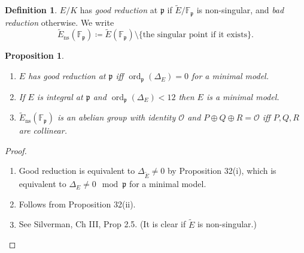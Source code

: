 \documentclass[a4paper]{article}
\newtheorem{proposition}[theorem]{Proposition}
\theoremstyle{definition}
\newtheorem*{definition}{Definition}
\DeclareMathOperator{\ord}{ord}
\newcommand{\ns}{\mathrm{ns}}
\newcommand{\p}{\mathfrak{p}}
\renewcommand{\O}{\mathcal{O}}
\newcommand{\F}{\mathbb{F}}
\begin{document}
\begin{definition}
    $E/K$ has \emph{good reduction} at $\p$ if $\tilde E/\F_\p$ is non-singular,
    and \emph{bad reduction} otherwise. We write
    \begin{equation*}
        \tilde E_\ns(\F_\p) \coloneq \tilde E(\F_\p)
            \setminus\{\text{the singular point if it exists}\}.
    \end{equation*}
\end{definition}

\begin{proposition}
    \begin{enumerate}[label=(\roman*)]
        \item $E$ has good reduction at $\p$ iff $\ord_\p(\Delta_E)=0$ for a
            minimal model.
        \item If $E$ is integral at $\p$ and $\ord_\p(\Delta_E)<12$ then $E$ is
            a minimal model.
        \item $\tilde E_\ns(\F_\p)$ is an abelian group with identity $\O$ and
            $P\oplus Q\oplus R=\O$ iff $P,Q,R$ are collinear.
    \end{enumerate}
\end{proposition}

\begin{proof}
    \begin{enumerate}[label=(\roman*)]
        \item Good reduction is equivalent to $\Delta_{\tilde E}\ne0$ by
            Proposition 32(i), which is equivalent to $\Delta_E\ne0\mod\p$ for a
            minimal model.

        \item Follows from Proposition 32(ii).

        \item See Silverman, Ch III, Prop 2.5. (It is clear if $\tilde E$ is
            non-singular.)
    \end{enumerate}
\end{proof}
\end{document}
